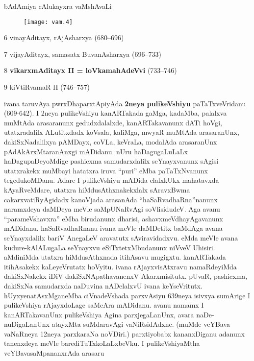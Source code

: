 \documentclass[11pt,a4size]{article}
\begin{document}
\bigskip
\centerline{bAdAmiya cAlukayxra vaMshAvaLi}
\medskip

\begin{figure}[H]
\centering
\texttt{[image: vam.4]} 
\end{figure}

\begin{flushright}
6 vinayAditayx, rAjAsharxya (680--696)

7 vijayAditayx, samasatx BuvanAsharxya (696--733)

8 \textbf{vikarxmAditayx {\rm II} = loVkamahAdeVvi} (733--746)

9 kiVtiRvamaR {\rm II} (746--757)
\end{flushright}


ivana taruvAya pwrxDhaparxtApiyAda \textbf{2neya pulikeVshiyu}
paTaTxveVridanu (609-642). I 2neya pulikeVshiyu kanARTakada gaMga,
kadaMba, palalxva muMtAda arasaranunx gedudxdalalxde, kanARTakavanunx
dATi hoVgi, utatxradalilx ALutitxdadx koVsala, kaliMga, mwyaR muMtAda
arasaranUnx, dakiSxNadalilxya pAMDayx, coVLa, keVraLa, modalAda
arasaranUnx pAdAkArxMtaranAnxgi mADidanu. nUru haDagugaLuLaLx
haDagupaDeyoMdige pashicxma samudarxdalilx seYnayxvanunx sAgisi
utatxrakekx muMbayi hatatxra iruva ``puri'' eMba paTaTxNvanunx
tegedukoMDanu. Adare I pulikeVshiyu mADida elalxkUkx mahatavxda
kAyaRveMdare, utatxra hiMdusAthxnakekxlalx sAravxBwma
cakarxvatiRyAgidadx kanoVjada arasanAda ``haSaRvadhaRna''nanunx
naramxdeya daMDeya meVle saMpUNaRvAgi soVlisidudeV. Aga avanu
``parameVshavxra'' eMba birudanunx dharisi, ashavxmeVdhayAgavanunx
mADidanu. haSaRvadhaRnanu ivana meVle daMDetitx baMdAga avana
seYnayxdalilx bariV AnegaLeV aravatutx sAviravidadxvu. eMda meVle
avana kudure-kAlALugaLa seYnayxvu eSiTxtetxMbudanunx niVveV
Uhisiri. aMdiniMda utatxra hiMdusAthxnada itihAsavu
mugigxtu. kanARTakada itihAsakekx kaLeyeVrutatx hoVyitu. ivana
rAjayxvisAtxravu namaRdeyiMda dakiSxNakekx iDiV dakiSxNApathavanenxV
Akarxmisitutx. pUvaR, pashicxma, dakiSxNa samudarxda naDuvina
nADelalxvU ivana keYseVritutx. hUyxyenatAsxMganeMba ciVnadeVshada
parxvAsiyu 639neya isivxya sumArige I pulikeVshiya rAjayxdoLage
saMcAra mADidanu. avanu namamx I kanARTakavanUnx pulikeVshiya Agina
parxjegaLanUnx, avara naDe-nuDigaLanUnx atayxMta suMdaravAgi
vaNiRsidAdxne. (muMde veYBava vaNaRneya 12neya parxkaraNa noVDiri.)
parxtiyobabx kananxDiganu adanunx tanenxdeya meVle
barediTuTxkoLaLxbeVku. I pulikeVshiyaMtha veYBavasaMpananxrAda arasaru
\end{document}
